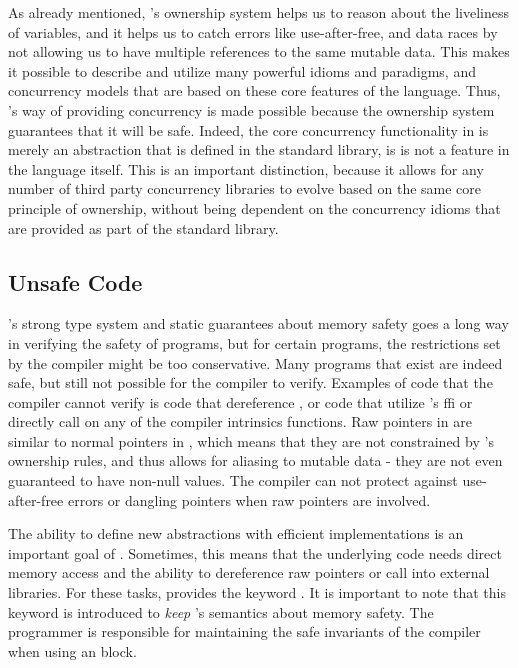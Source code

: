 As already mentioned, {\rust}'s ownership system helps us to reason about the liveliness of variables, and it helps us to catch errors like use-after-free, and data races by not allowing us to have multiple references to the same mutable data.
This makes it possible to describe and utilize many powerful idioms and paradigms, and concurrency models that are based on these core features of the language.
Thus, {\rust}'s way of providing concurrency is made possible because the ownership system guarantees that it will be safe.
Indeed, the core concurrency functionality in {\rust} is merely an abstraction that is defined in the standard library, is is not a feature in the language itself.
This is an important distinction, because it allows for any number of third party concurrency libraries to evolve based on the same core principle of ownership, without being dependent on the concurrency idioms that are provided as part of the standard library.

\subsection{Unsafe Code} %
\label{ssub:unsafe_code}

{\rust}'s strong type system and static guarantees about memory safety goes a long way in verifying the safety of programs, but for certain programs, the restrictions set by the compiler might be too conservative.
Many programs that exist are indeed safe, but still not possible for the compiler to verify.
Examples of code that the compiler cannot verify is code that dereference , or code that utilize {\rust}'s \gls{ffi} or directly call on any of the compiler intrinsics functions.
Raw pointers in {\rust} are similar to normal pointers in {\C}, which means that they are not constrained by {\rust}'s ownership rules, and thus allows for aliasing to mutable data - they are not even guaranteed to have non-null values.
The compiler can not protect against use-after-free errors or dangling pointers when raw pointers are involved.

The ability to define new abstractions with efficient implementations is an important goal of {\rust}.
Sometimes, this means that the underlying code needs direct memory access and the ability to dereference raw pointers or call into external libraries.
For these tasks, {\rust} provides the keyword {\unsafe}.
It is important to note that this {\unsafe} keyword is introduced to \emph{keep} {\rust}'s semantics about memory safety.
The programmer is responsible for maintaining the safe invariants of the compiler when using an {\unsafe} block.


